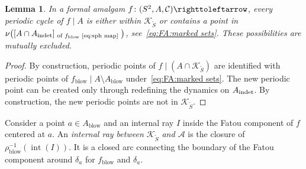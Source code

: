 \documentclass{amsart}
\theoremstyle{plain}
\newtheorem{lemma}[theorem]{Lemma}
\theoremstyle{definition}
\theoremstyle{remark}
\renewcommand{\AA}{{\mathcal A}}
\newcommand{\blowup}{{\operatorname{blow}}}
\newcommand{\filled}{{\mathcal K}}
\newcommand{\reminder}[1]{\textsl{$\lhd\rhd$#1$\lhd\rhd$}\marginpar{$\lhd\rhd\lhd\rhd\lhd\rhd$}}%
\newcommand{\hide}[1]{}
\newcommand{\CC}{{\mathcal C}}
\newcommand{\intr}{{\operatorname{int}}}
\newcommand\selfmap{\righttoleftarrow}
\begin{document}
\begin{lemma}
\label{lem:A:relat f f_blowup} In a formal amalgam $f\colon (S^2,A,\CC)\selfmap$, every periodic cycle of $f\mid A$ is either within $\filled_{\widetilde S}$ or contains a point in $\nu \big( [A\cap A_\indet ]_{\text{ of $f_\blowup$ \eqref{eq:sph map} }}\big)$, see~\eqref{eq:FA:marked sets}. These possibilities are mutually excluded.     
\end{lemma}
\begin{proof} By construction, periodic points of $f\mid (A\cap \filled_{\widetilde S})$ are identified with periodic points of $f_\blowup \mid A\setminus A_\blowup$ under~\eqref{eq:FA:marked sets}. The new periodic point can be created only through redefining the dynamics on $A_{\operatorname{indet}}$. By construction, the new periodic points are not in $\filled_{\widetilde S}$. 
\end{proof}



Consider a point $a\in A_\blowup$ and an internal ray $I$ inside the Fatou component of $f$ centered at $a$. An \emph{internal ray between $\filled_{\widetilde S}$ and $\AA$} is the closure of $\rho_\blowup^{-1}(\intr(I))$. It is a closed arc connecting the boundary of the Fatou component around $\delta_a$ for $f_\blowup$ and $\delta_a$.  



\end{document}
